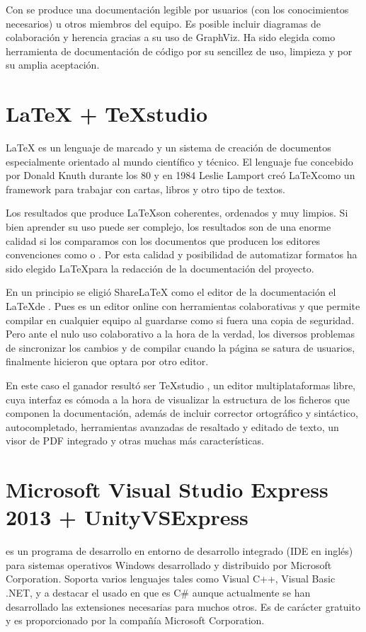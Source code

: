 Con  se produce una documentación legible por usuarios (con los conocimientos necesarios) u otros miembros del equipo. Es posible incluir diagramas de colaboración y herencia gracias a su uso de GraphViz. Ha sido elegida como herramienta de documentación de código por su sencillez de uso, limpieza y por su amplia aceptación.

\section*{LaTeX + TeXstudio}
\LaTeX {} es un lenguaje de marcado y un sistema de creación de documentos especialmente orientado al mundo científico y técnico. El lenguaje  fue concebido por Donald Knuth durante los 80 y en 1984 Leslie Lamport creó \LaTeX como un framework para trabajar con cartas, libros y otro tipo de textos.

Los resultados que produce \LaTeX son coherentes, ordenados y muy limpios. Si bien aprender su uso puede ser complejo, los resultados son de una enorme calidad si los comparamos con los documentos que producen los editores convenciones como  o . Por esta calidad y posibilidad de automatizar formatos ha sido elegido \LaTeX para la redacción de la documentación del proyecto.

En un principio se eligió ShareLaTeX  como el editor de la documentación el \LaTeX de \nombrejuego. Pues es un editor online con herramientas colaborativas y que permite compilar en cualquier equipo al guardarse como si fuera una copia de seguridad. Pero ante el nulo uso colaborativo a la hora de la verdad, los diversos problemas de sincronizar los cambios y de compilar cuando la página se satura de usuarios, finalmente hicieron que optara por otro editor. 

En este caso el ganador resultó ser TeXstudio , un editor multiplataformas libre, cuya interfaz es cómoda a la hora de visualizar la estructura de los ficheros que componen la documentación, además de incluir corrector ortográfico y sintáctico, autocompletado, herramientas avanzadas de resaltado y editado de texto, un visor de PDF integrado y otras muchas más características.

\section*{Microsoft Visual Studio Express 2013 + UnityVSExpress}
  es un programa de desarrollo en entorno de desarrollo integrado (IDE en inglés) para sistemas operativos Windows desarrollado y distribuido por Microsoft Corporation. Soporta varios lenguajes tales como Visual C++, Visual Basic .NET, y a destacar el usado en \nombrejuego que es C\# aunque actualmente se han desarrollado las extensiones necesarias para muchos otros. Es de carácter gratuito y es proporcionado por la compañía Microsoft Corporation.

